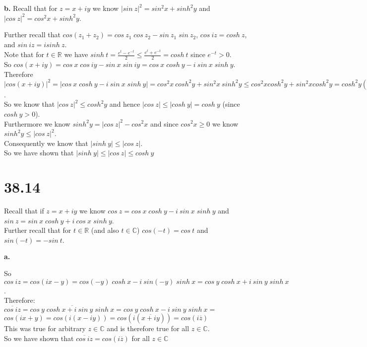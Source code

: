 \documentclass{article}
\begin{document}
{\Large\textbf{b.}} Recall that for $z = x + iy$ we know $|sin\:z|^2 = sin^2 x + sinh^2 y$ and $|cos\:z|^2 = cos^2 x + sinh^2 y$.
\begin{center}
    \doublespacing
    Further recall that $cos(z_1 + z_2) = cos\:z_1\;cos\:z_2 - sin\:z_1\;sin\:z_2$, $cos\:iz = cosh\:z$, and $sin\:iz = isinh\:z$.
    \\Note that for $t\in\mathbb{R}$ we have $sinh\:t =\frac{e^t - e^{-t}}{2}\leq\frac{e^t + e^{-t}}{2} = cosh\:t$ since $e^{-t} > 0$.
    \\So $cos(x + iy) = cos\:x\;cos\:iy - sin\:x\;sin\:iy = cos\:x\;cosh\:y - i\:sin\:x\;sinh\:y$.
    \\Therefore $|cos(x + iy)|^2 = |cos\:x\;cosh\:y - i\:sin\:x\;sinh\:y| = cos^2 x\:cosh^2 y + sin^2 x\:sinh^2 y\leq cos^2 x cosh^2 y + sin^2 x cosh^2 y = cosh^2 y(cos^2 x + sin^2 x) = cosh^2 y$.
    \\So we know that $|cos\:z|^2\leq cosh^2 y$ and hence $|cos\:z|\leq |cosh\:y| = cosh\:y$ (since $cosh\:y > 0$).
    \\Furthermore we know $sinh^2 y = |cos\:z|^2 - cos^2 x$ and since $cos^2 x\geq 0$ we know $sinh^2 y\leq |cos\:z|^2$.
    \\Consequently we know that $|sinh\:y|\leq |cos\:z|$.
    \\So we have shown that $|sinh\:y|\leq |cos\:z|\leq cosh\:y$ \qedsymbol
\end{center}


\section*{38.14}
\begin{center}
    \doublespacing
    Recall that if $z = x + iy$ we know $cos\:z = cos\:x\;cosh\:y - i\:sin\:x\;sinh\:y$ and $sin\:z = sin\:x\;cosh\:y + i\:cos\:x\;sinh\:y$.
    \\Further recall that for $t\in\mathbb{R}$ (and also $t\in\mathbb{C}$) $cos(-t) = cos\:t$ and $sin(-t) = -sin\:t$.
\end{center}

{\Large\textbf{a.}}
\begin{center}
    \doublespacing
    So $cos\:iz = cos(ix - y) = cos(-y)\;cosh\:x - i\:sin(-y)\;sinh\:x = cos\:y\;cosh\:x + i\:sin\:y\;sinh\:x$.
    \\Therefore:
    \\$\overline{cos\:iz} =\overline{cos\:y\;cosh\:x + i\:sin\:y\;sinh\:x} = cos\:y\;cosh\:x - i\:sin\:y\;sinh\:x =$
    \\$cos(ix + y) = cos(i(x - iy)) = cos(i(\overline{x + iy})) = cos(i\overline{z})$
    \\This was true for arbitrary $z\in\mathbb{C}$ and is therefore true for all $z\in\mathbb{C}$.
    \\So we have shown that $\overline{cos\:iz} = cos(i\overline{z})$ for all $z\in\mathbb{C}$ \qedsymbol
\end{center}
\end{document}
